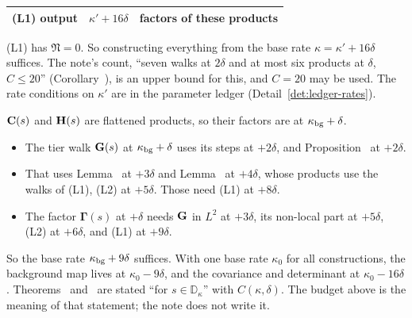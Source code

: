 \begin{detail}
\begin{step}
\begin{center}
\begin{tabular}{@{}lll@{}}
(L1) output & $\kappa'+16\delta$ & factors of these products\\
\bottomrule
\end{tabular}
\end{center}
(L1) has $\mathfrak N=0$. So constructing everything from the base rate $\kappa=\kappa'+16\delta$ suffices. The note's count, ``seven walks at $2\delta$ and at most six products at $\delta$, $C\le20$'' (Corollary~), is an upper bound for this, and $C=20$ may be used. The rate conditions on $\kappa'$ are in the parameter ledger (Detail~\ref{det:ledger-rates}).
\end{step}
\begin{step}
$\mathbf C(s)$ and $\mathbf H(s)$ are flattened products, so their factors are at $\kappa_{\rm bg}+\delta$.
\begin{itemize}
\item The tier walk $\mathbf G(s)$ at $\kappa_{\rm bg}+\delta$ uses its steps at $+2\delta$, and Proposition~ at $+2\delta$.
\item That uses Lemma~ at $+3\delta$ and Lemma~ at $+4\delta$, whose products use the walks of (L1), (L2) at $+5\delta$. Those need (L1) at $+8\delta$.
\item The factor $\boldsymbol\Gamma(s)$ at $+\delta$ needs $\mathbf G$ in $L^2$ at $+3\delta$, its non-local part at $+5\delta$, (L2) at $+6\delta$, and (L1) at $+9\delta$.
\end{itemize}
So the base rate $\kappa_{\rm bg}+9\delta$ suffices. With one base rate $\kappa_0$ for all constructions, the background map lives at $\kappa_0-9\delta$, and the covariance and determinant at $\kappa_0-16\delta$. Theorems~ and~ are stated ``for $s\in\mathbb D_\kappa$'' with $C(\kappa,\delta)$. The budget above is the meaning of that statement; the note does not write it.
\end{step}
\end{detail}

